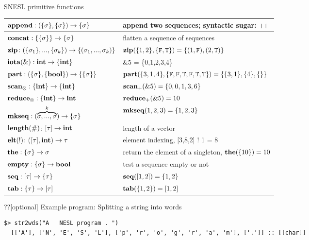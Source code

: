 \documentclass{beamer}
\begin{document}
\begin{frame}[fragile]{SNESL primitive functions}
	\begin{table}\footnotesize 
		\begin{tabular}{p{}|p{}}
			\hline
			$\mathbf{append : (\{\sigma\}, \{\sigma\}) \rightarrow \{\sigma\}}$ & append two sequences; syntactic sugar: ${\++}$ \\ \hline
			$\mathbf{concat: \{\{\sigma\}\} \rightarrow \{\sigma\} }$ &  flatten a sequence of sequences                 \\ \hline
			$\mathbf{zip} \colon (\{\sigma_1\}, ..., \{\sigma_k\})\rightarrow \{(\sigma_1,...,\sigma_k)\}$ & $\mathbf{zip}(\{1,2\},\{\mathtt{F},\mathtt{T}\}) = \{(1,\mathtt{F}),(2,\mathtt{T})\}$\\ \hline
			$\mathbf{iota(\&): \mathbf{int} \rightarrow \{\mathbf{int}\}}$  &  \&5 = \{0,1,2,3,4\} \\ \hline
			$\mathbf{part: (\{\sigma\}, \{\mathbf{bool}\}) \rightarrow  \{\{\sigma\}\}}$   & $\mathbf{part}(\{3,1,4\}, \{\mathtt{F},\mathtt{F},\mathtt{T},\mathtt{F},\mathtt{T},\mathtt{T}\}) = \{\{3,1\},\{4\},\{\}\}$                \\ \hline
			$\mathbf{scan_\otimes}: \{\mathbf{int}\} \rightarrow \{\mathbf{int}\}$     & $\mathbf{scan_+}(\&5) = \{0,0,1,3,6\} $  \\ \hline
			$\mathbf{reduce_\otimes: \{\mathbf{int}\} \rightarrow \mathbf{int} }$     &  $\mathbf{reduce_+}(\&5) = 10$              \\ \hline
			$\mathbf{mkseq}: (\overbrace{\sigma,...,\sigma}^{k}) \rightarrow \{\sigma\}$  & $\mathbf{mkseq}(1,2,3) = \{1,2,3\}$ \\ \hline  
			$\mathbf{length(\#)}$: $[\tau] \rightarrow \mathbf{int}$ & length of a vector \\ \hline  
			$\mathbf{elt(!)}$: ($[\tau], \mathbf{int}) \rightarrow \tau$  & element indexing, [3,8,2] ! 1 = 8 \\ \hline  
			$\mathbf{the:  \{\sigma\} \rightarrow \sigma}$     &  return the element of a singleton,  $\mathbf{the}(\{10\}) = 10$        \\ \hline
			$\mathbf{empty:  \{\sigma\} \rightarrow \mathbf{bool}}$       & test a sequence empty or not             \\ \hline  
			$\mathbf{seq}: [\tau] \rightarrow \{\tau\} $  & $\mathbf{seq}([1,2]) = \{1,2\}$ \\ \hline  
			$\mathbf{tab}: \{\tau\} \rightarrow [\tau] $  & $\mathbf{tab}(\{1,2\}) = [1,2]$\\ \hline  
		\end{tabular}
	\end{table}
	
\end{frame}

\begin{frame}[fragile]{??[optional] Example program: Splitting a string into words}

 
 
	
\begin{lstlisting}[style=nesl-style]
  $> str2wds("A   NESL program . ")
  [['A'], ['N', 'E', 'S', 'L'], ['p', 'r', 'o', 'g', 'r', 'a', 'm'], ['.']] :: [[char]]
\end{lstlisting}
\end{frame}
\end{document}
